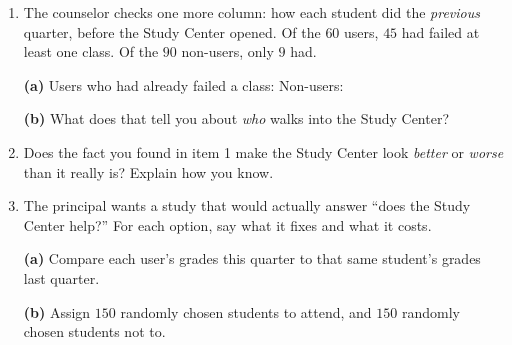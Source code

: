 \documentclass[10pt]{article}
\begin{document}
\boxguard
\begin{tcolorbox}[colback=white, colframe=black!40, breakable,
    title=\textbf{Tier E --- Extension},
    fonttitle=\bfseries, arc=2mm, left=3mm, right=3mm, top=2mm, bottom=2mm]
\small
\begin{enumerate}[leftmargin=1.6em, itemsep=5pt, topsep=3pt]

  \item The counselor checks one more column: how each student did the
        \emph{previous} quarter, before the Study Center opened. Of the $60$
        users, $45$ had failed at least one class. Of the $90$ non-users, only
        $9$ had.

        \textbf{(a)} Users who had already failed a class:  \quad
        Non-users: 

        \textbf{(b)} What does that tell you about \emph{who} walks into the
        Study Center?

  \item Does the fact you found in item 1 make the Study Center look
        \emph{better} or \emph{worse} than it really is? Explain how you know.

  \item The principal wants a study that would actually answer ``does the Study
        Center help?'' For each option, say what it fixes and what it costs.

        \textbf{(a)} Compare each user's grades this quarter to that same
        student's grades last quarter.

        \textbf{(b)} Assign $150$ randomly chosen students to attend, and $150$
        randomly chosen students not to.
\end{enumerate}
\end{tcolorbox}
\end{document}

